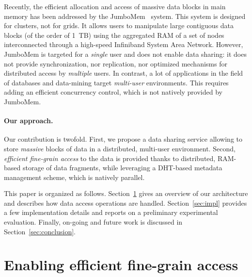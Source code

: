 \documentclass{llncs}
\begin{document}
Recently, the efficient allocation and access of massive data blocks
in main memory has been addressed by the JumboMem~\cite{PakJoh07JumboMem}
system.  This system is designed for clusters, not for grids. It allows
users to manipulate large contiguous data blocks (of the order of
1~TB) using the aggregated RAM of a set of nodes interconnected
through a high-speed Infiniband System Area
Network. However, JumboMem is targeted for a \emph{single} user and
does not enable data sharing: it does not provide synchronization, nor
replication, nor optimized mechanisms for distributed access by
\emph{multiple} users. In contrast,  a lot of applications in the field of
databases and data-mining target \emph{multi-user} environments. This
requires adding an efficient  concurrency control, which is
not natively provided by JumboMem.





\paragraph{Our approach.}

Our contribution is twofold. First, we propose a data sharing service
allowing to store \emph{massive} blocks of data in a distributed,
multi-user environment. Second, \emph{efficient fine-grain access} to
the data is provided thanks to distributed, RAM-based storage of data
fragments, while leveraging a DHT-based metadata
management scheme, which is natively parallel.

This paper is organized as follows. Section~\ref{sec:contrib} gives an
overview of our architecture and describes how data access operations
are handled. Section~\ref{sec:impl} provides a few implementation
details and reports on a preliminary experimental evaluation. 
Finally, on-going
and future work is discussed in Section~\ref{sec:conclusion}.



\section{Enabling efficient fine-grain access}
\label{sec:contrib}
\end{document}

